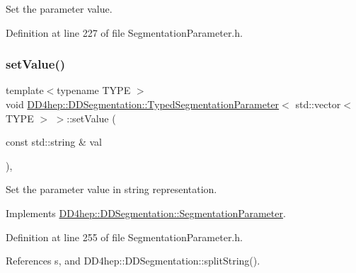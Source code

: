 Set the parameter value. 



Definition at line 227 of file Segmentation\+Parameter.\+h.

\hypertarget{class_d_d4hep_1_1_d_d_segmentation_1_1_typed_segmentation_parameter_3_01std_1_1vector_3_01_t_y_p_e_01_4_01_4_ad36f5a4953d42c4d9252423f129c50de}{}\label{class_d_d4hep_1_1_d_d_segmentation_1_1_typed_segmentation_parameter_3_01std_1_1vector_3_01_t_y_p_e_01_4_01_4_ad36f5a4953d42c4d9252423f129c50de} 
\subsubsection{\texorpdfstring{set\+Value()}{setValue()}}
{\footnotesize\ttfamily template$<$typename T\+Y\+PE $>$ \\
void \hyperlink{class_d_d4hep_1_1_d_d_segmentation_1_1_typed_segmentation_parameter}{D\+D4hep\+::\+D\+D\+Segmentation\+::\+Typed\+Segmentation\+Parameter}$<$ std\+::vector$<$ T\+Y\+PE $>$ $>$\+::set\+Value (\begin{DoxyParamCaption}\item[{const std\+::string \&}]{val }\end{DoxyParamCaption})\hspace{0.3cm}{\ttfamily [inline]}, {\ttfamily [virtual]}}



Set the parameter value in string representation. 



Implements \hyperlink{class_d_d4hep_1_1_d_d_segmentation_1_1_segmentation_parameter_a91e9dae172660687daec4de4d730b192}{D\+D4hep\+::\+D\+D\+Segmentation\+::\+Segmentation\+Parameter}.



Definition at line 255 of file Segmentation\+Parameter.\+h.



References s, and D\+D4hep\+::\+D\+D\+Segmentation\+::split\+String().

\hypertarget{class_d_d4hep_1_1_d_d_segmentation_1_1_typed_segmentation_parameter_3_01std_1_1vector_3_01_t_y_p_e_01_4_01_4_ae4f6da133bbd4b71b2593db7bf26824a}{}\label{class_d_d4hep_1_1_d_d_segmentation_1_1_typed_segmentation_parameter_3_01std_1_1vector_3_01_t_y_p_e_01_4_01_4_ae4f6da133bbd4b71b2593db7bf26824a} 
